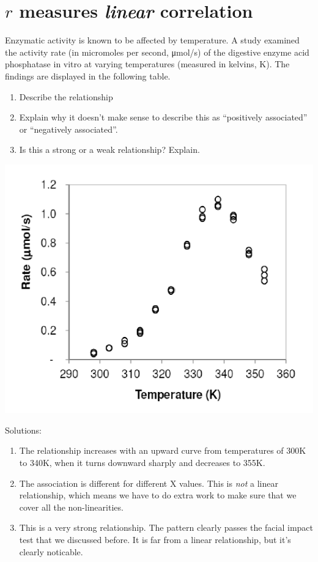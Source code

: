\documentclass[
  letterpaper,
  DIV=11,
  numbers=noendperiod]{scrreprt}
\providecommand{\tightlist}{%
  \setlength{\itemsep}{0pt}\setlength{\parskip}{0pt}}\usepackage{longtable,booktabs,array}
\begin{document}
\hypertarget{r-measures-linear-correlation}{%
\section{\texorpdfstring{\(r\) measures \emph{linear}
correlation}{r measures linear correlation}}\label{r-measures-linear-correlation}}

Enzymatic activity is known to be affected by temperature. A study
examined the activity rate (in micromoles per second, μmol/s) of the
digestive enzyme acid phosphatase in vitro at varying temperatures
(measured in kelvins, K). The findings are displayed in the following
table.

\pspace

\begin{enumerate}
\def\labelenumi{\alph{enumi}.}
\tightlist
\item
  Describe the relationship
\item
  Explain why it doesn't make sense to describe this as ``positively
  associated'' or ``negatively associated''.
\item
  Is this a strong or a weak relationship? Explain.
\end{enumerate}

\includegraphics[width=\textwidth]{figs/non-linear.png}

Solutions:

\begin{enumerate}
\def\labelenumi{\alph{enumi}.}
\tightlist
\item
  The relationship increases with an upward curve from temperatures of
  300K to 340K, when it turns downward sharply and decreases to 355K.
\item
  The association is different for different X values. This is
  \emph{not} a linear relationship, which means we have to do extra work
  to make sure that we cover all the non-linearities.
\item
  This is a very strong relationship. The pattern clearly passes the
  facial impact test that we discussed before. It is far from a linear
  relationship, but it's clearly noticable.
\end{enumerate}
\end{document}
